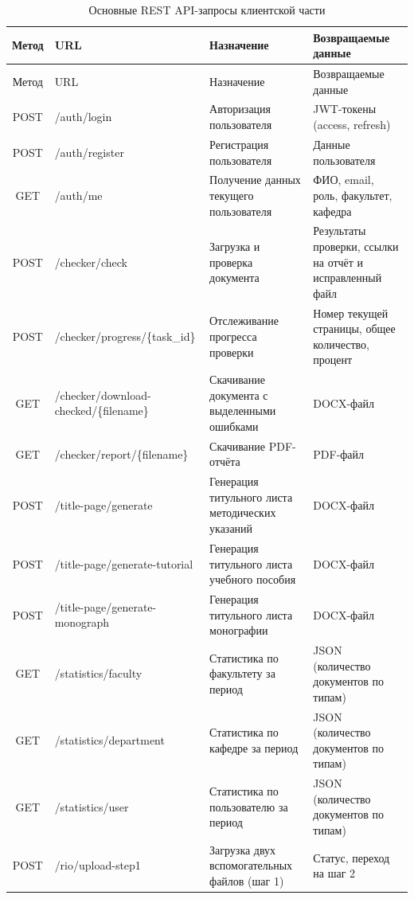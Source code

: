 \begin{xltabular}{\textwidth}{|c|X|X|X|}
	\caption{Основные REST API-запросы клиентской части\label{tab:api_requests}}\\
	\hline
	Метод & URL & Назначение & Возвращаемые данные \\ \hline
	\endfirsthead
	
	\hline
	Метод & URL & Назначение & Возвращаемые данные \\ \hline
	\endhead
	
	\hline
	\endfoot
	
	POST & /auth/login & Авторизация пользователя & JWT-токены (access, refresh) \\ \hline
	POST & /auth/register & Регистрация пользователя & Данные пользователя \\ \hline
	GET & /auth/me & Получение данных текущего пользователя & ФИО, email, роль, факультет, кафедра \\ \hline
	POST & /checker/check & Загрузка и проверка документа & Результаты проверки, ссылки на отчёт и исправленный файл \\ \hline
	POST & /checker/progress/\allowbreak\{task\_id\} & Отслеживание прогресса проверки & Номер текущей страницы, общее количество, процент \\ \hline
	GET & /checker/download-checked/\{filename\} & Скачивание документа с выделенными ошибками & DOCX-файл \\ \hline
	GET & /checker/report/\allowbreak\{filename\} & Скачивание PDF-отчёта & PDF-файл \\ \hline
	POST & /title-page/generate & Генерация титульного листа методических указаний & DOCX-файл \\ \hline
	POST & /title-page/generate-tutorial & Генерация титульного листа учебного пособия & DOCX-файл \\ \hline
	POST & /title-page/generate-monograph & Генерация титульного листа монографии & DOCX-файл \\ \hline
	GET & /statistics/faculty & Статистика по факультету за период & JSON (количество документов по типам) \\ \hline
	GET & /statistics/department & Статистика по кафедре за период & JSON (количество документов по типам) \\ \hline
	GET & /statistics/user & Статистика по пользователю за период & JSON (количество документов по типам) \\ \hline
	POST & /rio/upload-step1 & Загрузка двух вспомогательных файлов (шаг 1) & Статус, переход на шаг 2 \\ \hline

\end{xltabular}
